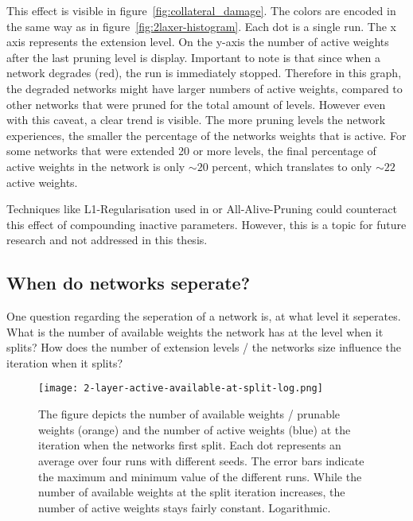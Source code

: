 This effect is visible in figure~\ref{fig:collateral_damage}.
The colors are encoded in the same way as in figure~\ref{fig:2laxer-histogram}.
Each dot is a single run. 
The x axis represents the extension level.
On the y-axis the number of active weights after the last pruning level is display.
Important to note is that since when a network degrades (red), the run is immediately stopped.
Therefore in this graph, the degraded networks might have larger numbers of active weights, compared to other networks that were pruned for the total amount of levels.
However even with this caveat, a clear trend is visible.
The more pruning levels the network experiences, the smaller the percentage of the networks weights that is active.
For some networks that were extended 20 or more levels, the final percentage of active weights in the network is only $\sim20$ percent, which translates to only $\sim22$ active weights.

Techniques like L1-Regularisation used in \autocite{HanEtAl15} or All-Alive-Pruning \autocite{AllAlivePruning} could counteract this effect of compounding inactive parameters.
However, this is a topic for future research and not addressed in this thesis. 

\subsection{When do networks seperate?}
One question regarding the seperation of a network is, at what level it seperates.
What is the number of available weights the network has at the level when it splits?
How does the number of extension levels / the networks size influence the iteration when it splits?

\begin{figure}[ht]
    \centering
    \texttt{[image: 2-layer-active-available-at-split-log.png]}
    \caption{
        The figure depicts the number of available weights / prunable weights (orange) and the number of active weights (blue) at the iteration when the networks first split.
        Each dot represents an average over four runs with different seeds.
        The error bars indicate the maximum and minimum value of the different runs.
        While the number of available weights at the split iteration increases, the number of active weights stays fairly constant.
        Logarithmic.
    }\label{fig:2l-active-split}
\end{figure}

